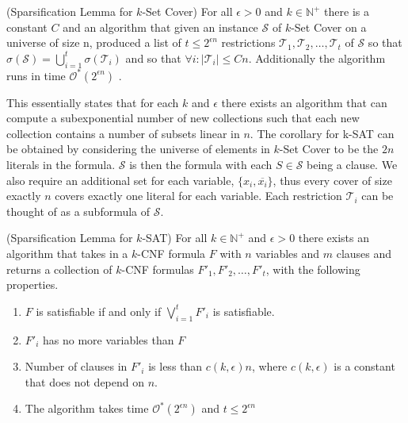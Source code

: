 \begin{theorem} \label{thm:kset_sparse}
    (Sparsification Lemma for $k$-Set Cover)
    For all $\epsilon > 0$ and $k \in \mathbb{N}^{+}$ there is a constant $C$ and an algorithm that given an instance $\mathcal{S}$
    of $k$-Set Cover on a universe of size n, produced a list of $t \leq 2^{\epsilon n}$ restrictions $\mathcal{T}_1, \mathcal{T}_2, \dots, \mathcal{T}_t$
    of $\mathcal{S}$ so that $\sigma(\mathcal{S}) = \bigcup_{i = 1}^{t} \sigma(\mathcal{T}_i)$ and so that $\forall i: |\mathcal{T}_i| \leq Cn$.
    Additionally the algorithm runs in time $\mathcal{O}^{\ast}(2^{\epsilon n})$ \cite{impagliazzo2001problems}.
\end{theorem}

This essentially states that for each $k$ and $\epsilon$ there exists an algorithm that can compute a subexponential number
of new collections such that each new collection contains a number of subsets linear in $n$.
The corollary for k-SAT can be obtained by considering the universe of elements in $k$-Set Cover to be
the $2n$ literals in the formula. $\mathcal{S}$ is then the formula with each $S \in \mathcal{S}$ being a clause.
We also require an additional set for each variable, $\{x_i, \overline{x_i}\}$, thus every cover of size exactly $n$
covers exactly one literal for each variable. Each restriction $\mathcal{T}_i$ can be thought of as a subformula of $\mathcal{S}$.

\begin{corollary} \label{cor:ksat_sparse}
    (Sparsification Lemma for $k$-SAT)
    For all $k \in \mathbb{N}^{+}$ and $\epsilon > 0$ there exists an algorithm that takes in a $k$-CNF formula $F$
    with $n$ variables and $m$ clauses and returns a collection of $k$-CNF formulas 
    $F'_1, F'_2, \dots, F'_t$, with the following properties.
    \begin{enumerate}
        \item $F$ is satisfiable if and only if $\bigvee_{i=1}^{t} F'_i$ is satisfiable.
        \item $F'_i$ has no more variables than $F$
        \item Number of clauses in $F'_i$ is less than $c(k, \epsilon)n$, where $c(k, \epsilon)$
        is a constant that does not depend on $n$.
        \item The algorithm takes time $\mathcal{O}^{\ast}(2^{\epsilon n})$ and $t \leq 2^{\epsilon n}$
    \end{enumerate}
\end{corollary}

